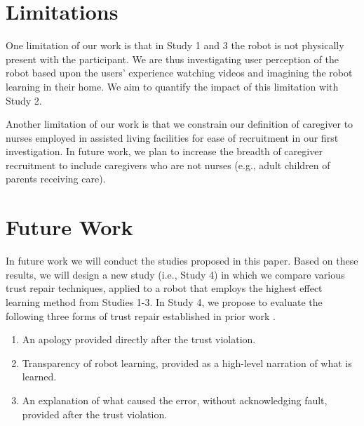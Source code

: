\documentclass[letterpaper]{article} %
\begin{document}
\section{Limitations}
\label{sec:limitations}
One limitation of our work is that in Study 1 and 3 the robot is not physically present with the participant. We are thus investigating user perception of the robot based upon the users' experience watching videos and imagining the robot learning in their home. We aim to quantify the impact of this limitation with Study 2. 

Another limitation of our work is that we constrain our definition of caregiver to nurses employed in assisted living facilities for ease of recruitment in our first investigation. In future work, we plan to increase the breadth of caregiver recruitment to include caregivers who are not nurses (e.g., adult children of parents receiving care). %


\section{Future Work}
\label{sec:futurework}
In future work we will conduct the studies proposed in this paper. Based on these results, we will design a new study (i.e., Study 4) in which we compare various trust repair techniques, applied to a robot that employs the highest effect learning method from Studies 1-3. In Study 4, we propose to evaluate the following three forms of trust repair established in prior work \cite{de_visser_towards_2020, baker_toward_2018, robinette_timing_2015, kim_repairing_2013}.

\begin{enumerate}
    \item An apology provided directly after the trust violation.
    \item Transparency of robot learning, provided as a high-level narration of what is learned.
    \item An explanation of what caused the error, without acknowledging fault, provided after the trust violation.
\end{enumerate}
\end{document}
